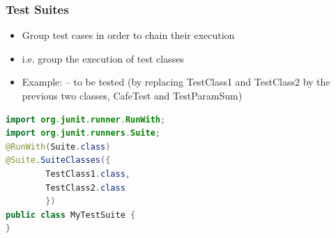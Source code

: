 \documentclass{beamer}
\begin{document}
\begin{frame}[fragile]
\frametitle{Test Suites}
\begin{itemize}
  \item Group test cases in order to chain their execution
  \item i.e. group the execution of test classes
  \item Example: -- to be tested (by replacing TestClass1 and
    TestClass2 by the previous two classes, CafeTest and TestParamSum)
\end{itemize}
\begin{tiny}
\begin{lstlisting}[language=JAVA]
import org.junit.runner.RunWith;
import org.junit.runners.Suite;
@RunWith(Suite.class)
@Suite.SuiteClasses({
        TestClass1.class,
        TestClass2.class
        })
public class MyTestSuite {
}
\end{lstlisting}                
\end{tiny}

\end{frame}

\begin{frame}


\end{frame}
\end{document}
